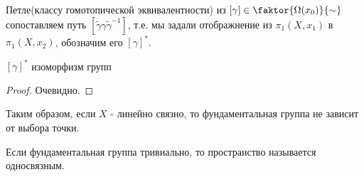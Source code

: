 Петле(классу гомотопической эквивалентности) из $[\gamma ]\in \faktor{\Omega(x_0)}{\sim}$ сопоставляем путь $[\tilde{\gamma} \gamma \tilde{\gamma}^{-1}]$, т.е. мы задали отображнение из $\pi_1(X, x_1)$ в $\pi_1(X, x_2)$, обозначим его $[\gamma]^*$.

\begin{statement}
    $[\gamma]^*$ изоморфизм групп
\end{statement}
\begin{proof}
    Очевидно.
\end{proof}
Таким образом, если $X$ - линейно связно, то фундаментальная группа не зависит от выбора точки.

\begin{definition}
    Если фундаментальная группа тривиально, то пространство называется односвязным.
\end{definition}


 
